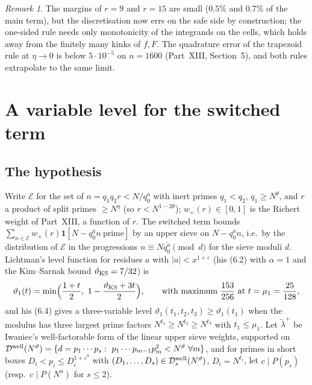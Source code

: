 \documentclass[11pt]{amsart}
\theoremstyle{remark}
\newtheorem{remark}[theorem]{Remark}
\newcommand{\e}{\varepsilon}
\newcommand{\cE}{\mathcal E}
\begin{document}
\begin{remark}
The margins of $r=9$ and $r=15$ are small ($0.5\%$ and $0.7\%$ of the main term), but the discretisation now errs on the safe side by construction; the one-sided rule needs only monotonicity of the integrands on the cells, which holds away from the finitely many kinks of $f,F$. The quadrature error of the trapezoid rule at $\eta\to0$ is below $5\cdot10^{-5}$ on $n=1600$ (Part~XIII, Section~5), and both rules extrapolate to the same limit.
\end{remark}

\section{A variable level for the switched term}\label{sec:level}
\subsection{The hypothesis}
Write $\cE$ for the set of $n=q_1q_2r<N/q_0^a$ with inert primes $q_1<q_2$, $q_1\ge N^\theta$, and $r$ a product of split primes $\ge N^\eta$ (so $r<N^{1-2\theta}$); $w_+(r)\in[0,1]$ is the Richert weight of Part~XIII, a function of $r$. The switched term bounds $\sum_{n\in\cE}w_+(r)\mathbf 1[N-q_0^an\ \text{prime}]$ by an upper sieve on $N-q_0^an$, i.e.\ by the distribution of $\cE$ in the progressions $n\equiv N\overline{q_0^a}\pmod d$ for the sieve moduli $d$. Lichtman's level function for residues $a$ with $|a|<x^{1+\e}$ (his (6.2) with $\alpha=1$ and the Kim--Sarnak bound $\vartheta_{\rm KS}=7/32$) is
\[
\vartheta_1(t)=\min\Bigl(\frac{1+t}2,\ 1-\frac{\vartheta_{\rm KS}+3t}2\Bigr),\qquad\text{with maximum }\frac{153}{256}\text{ at }t=\mu_1=\frac{25}{128},
\]
and his (6.4) gives a three-variable level $\vartheta_1(t_1,t_2,t_3)\ge\vartheta_1(t_1)$ when the modulus has three largest prime factors $N^{t_1}\ge N^{t_2}\ge N^{t_3}$ with $t_1\le\mu_1$. Let $\tilde\lambda^+$ be Iwaniec's well-factorable form of the linear upper sieve weights, supported on $\mathcal D^{\rm well}(N^\vartheta)=\{d=p_1\cdots p_s:\ p_1\cdots p_{m-1}p_m^2<N^\vartheta\ \forall m\}$, and for primes in short boxes $D_i<p_i\le D_i^{1+\e^9}$ with $(D_1,\dots,D_s)\in\mathcal D^{\rm well}_s(N^\vartheta)$, $D_i=N^{t_i}$, let $c\mid P(p_s)$ (resp.\ $c\mid P(N^u)$ for $s\le2$).
\end{document}
